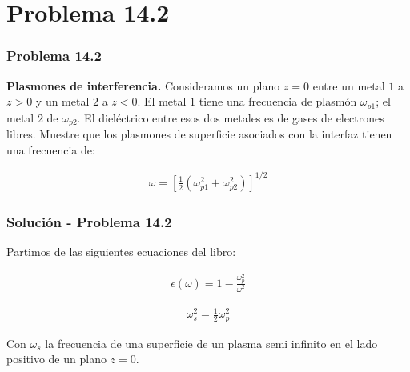 \documentclass[10pt]{beamer}
\begin{document}
\section{Problema 14.2}

\begin{frame}
    \frametitle{Problema 14.2}

    \textbf{Plasmones de interferencia.} Consideramos un plano $z=0$ entre un metal $1$ a $z>0$ y un metal $2$ a $z<0$. El metal $1$ tiene una frecuencia de plasmón $\omega_{p1}$; el metal $2$ de $\omega_{p2}$. El dieléctrico entre esos dos metales es de gases de electrones libres. Muestre que los plasmones de superficie asociados con la interfaz tienen una frecuencia de:

    \begin{align*}
        \omega = \left[\frac{1}{2}\left(\omega_{p1}^2+\omega_{p2}^2\right)\right]^{1/2}
    \end{align*}

\end{frame}

\begin{frame}
    \frametitle{Solución - Problema 14.2}

    Partimos de las siguientes ecuaciones del libro:

    \begin{align*}
        \epsilon(\omega) = 1-\frac{\omega_p^2}{\omega^2} \tag{10}
    \end{align*}

    \begin{align*}
        \omega_s^2 = \frac{1}{2}\omega_p^2 \tag{71}
    \end{align*}

    Con $\omega_s$ la frecuencia de una superficie de un plasma semi infinito en el lado positivo de un plano $z=0$.

\end{frame}
\end{document}
